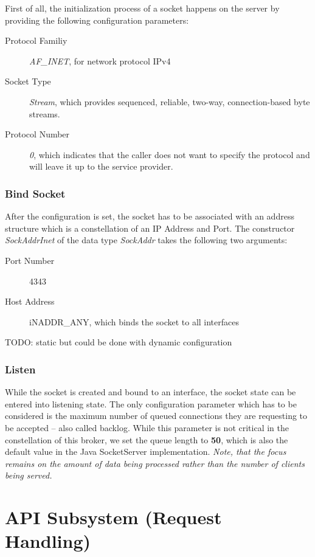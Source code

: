 First of all, the initialization process of a socket happens on the server by providing the following configuration parameters:
\begin{description}
  \item[Protocol Familiy] \textit{AF\_INET}, for network protocol IPv4
  \item[Socket Type] \textit{Stream}, which provides sequenced, reliable, two-way, connection-based byte streams.
  \item[Protocol Number] \textit{0}, which indicates that the caller does not want to specify the protocol and will leave it up to the service provider.
\end{description}

\subsubsection{Bind Socket}

After the configuration is set, the socket has to be associated with an address
structure which is a constellation of an IP Address and Port. The constructor
\textit{SockAddrInet} of the data type \textit{SockAddr} takes the following
two arguments:

\begin{description}
  \item[Port Number] 4343
  \item[Host Address] iNADDR\_ANY, which binds the socket to all interfaces
\end{description}

TODO: static but could be done with dynamic configuration

\subsubsection{Listen}

While the socket is created and bound to an interface, the socket state can be
entered into listening state. The only configuration parameter which has to be
considered is the maximum number of queued connections they are requesting to
be accepted -- also called backlog. While this parameter is not critical in the
constellation of this broker, we set the queue length to \textbf{50}, which is
also the default value in the Java SocketServer implementation. \textit{Note,
that the focus remains on the amount of data being processed rather than the
number of clients being served.}

\section{API Subsystem (Request Handling)}

